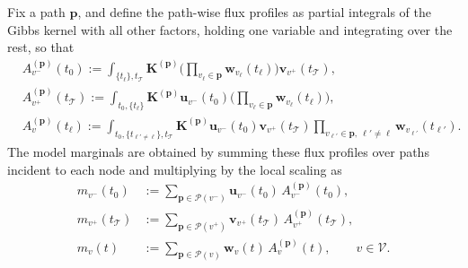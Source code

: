 \documentclass[11pt]{article}
\newcommand{\calV}{{\mathcal V}}
\newcommand{\calT}{{\mathcal T}}
\newcommand{\calP}{{\mathcal P}}
\newcommand{\bK}{{\mathbf K}}
\newcommand{\bp}{{\mathbf p}}
\newcommand{\bu}{{\mathbf u}}
\newcommand{\bv}{{\mathbf v}}
\newcommand{\bw}{{\mathbf w}}
\begin{document}
Fix a path $\bp$, and define the path-wise flux profiles as partial integrals of the Gibbs kernel with all other factors, holding one variable and integrating over the rest, so that
\begin{align}\label{eq:flux-profile}
&A^{(\bp)}_{v^-}(t_0):=\int_{\{t_\ell\},t_\calT} \!\!\!\!\!\!\!\!\!\! \bK^{(\bp)}\Big(\prod_{v_\ell\in\bp} \bw_{v_\ell}(t_\ell)\Big) \bv_{v^+}(t_{\calT}),\nonumber \\
&A^{(\bp)}_{v^+}(t_{\calT}):=\int_{t_0,\{t_\ell\}} \!\!\!\!\!\!\!\!\!\! \bK^{(\bp)}\bu_{v^-}(t_0)\Big(\prod_{v_\ell\in\bp} \bw_{v_\ell}(t_\ell)\Big),\\
&A^{(\bp)}_{v}(t_\ell):=\int_{t_0,\{t_{\ell'\neq \ell}\},t_{\calT}} \!\!\!\!\!\!\!\!\!\!\!\!\!\!\!\!\!\!\!\!\! \bK^{(\bp)}\bu_{v^-}(t_0)\bv_{v^+}(t_{\calT})
\!\!\!\!\prod_{v_{\ell'}\in\bp,\ \ell'\neq \ell}\!\!\!\!\!\!\! \bw_{v_{\ell'}}(t_{\ell'}).\nonumber
\end{align}
The model marginals are obtained by summing these flux profiles over paths incident to each node and multiplying by the local scaling as 
\begin{align}\label{eq:aggregate}
m_{v^-}(t_0)
&:= \sum_{\bp\in\calP(v^-)} \bu_{v^-}(t_0)\,A^{(\bp)}_{v^-}(t_0),\nonumber\\
m_{v^+}(t_{\calT})
&:= \sum_{\bp\in\calP(v^+)} \bv_{v^+}(t_{\calT})\,A^{(\bp)}_{v^+}(t_{\calT}),\\
m_{v}(t)
&:= \sum_{\bp\in\calP(v)} \bw_{v}(t)\,A^{(\bp)}_{v}(t),
\qquad v\in\calV.\nonumber
\end{align}

\end{document}
